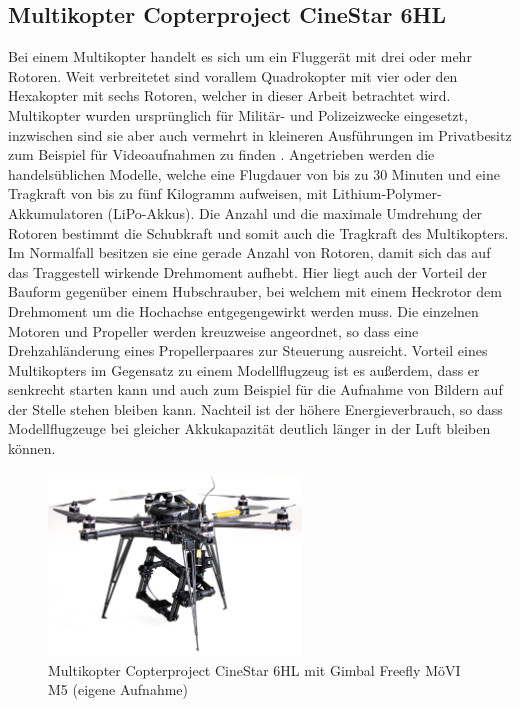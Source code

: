 \documentclass[a4paper,12pt,bibliography=totoc, listof=totoc,titlepage,pointlessnumbers]{scrreprt}
\begin{document}
\subsection{Multikopter Copterproject CineStar 6HL}
Bei einem Multikopter handelt es sich um ein Fluggerät mit drei oder mehr Rotoren. Weit verbreitetet sind vorallem Quadrokopter mit vier oder den Hexakopter mit sechs Rotoren, welcher in dieser Arbeit betrachtet wird. Multikopter wurden ursprünglich für Militär- und Polizeizwecke eingesetzt, inzwischen sind sie aber auch vermehrt in kleineren Ausführungen im Privatbesitz zum Beispiel für Videoaufnahmen zu finden \citep{Quadro}. Angetrieben werden die handelsüblichen Modelle, welche eine Flugdauer von bis zu 30 Minuten und eine Tragkraft von bis zu fünf Kilogramm aufweisen, mit Lithium-Polymer-Akkumulatoren (LiPo-Akkus). Die Anzahl und die maximale Umdrehung der Rotoren bestimmt die Schubkraft und somit auch die Tragkraft des Multikopters. Im Normalfall besitzen sie eine gerade Anzahl von Rotoren, damit sich das auf das Traggestell wirkende Drehmoment aufhebt. Hier liegt auch der Vorteil der Bauform gegenüber einem Hubschrauber, bei welchem mit einem Heckrotor dem Drehmoment um die Hochachse entgegengewirkt werden muss. Die einzelnen Motoren und Propeller werden kreuzweise angeordnet, so dass eine Drehzahländerung eines Propellerpaares zur Steuerung ausreicht. Vorteil eines Multikopters im Gegensatz zu einem Modellflugzeug ist es außerdem, dass er senkrecht starten kann und auch zum Beispiel für die Aufnahme von Bildern auf der Stelle stehen bleiben kann. Nachteil ist der höhere Energieverbrauch, so dass Modellflugzeuge bei gleicher Akkukapazität deutlich länger in der Luft bleiben können. \citep{Bachfeld}

\begin{figure}[!ht]
 \centering
 \includegraphics[width=0.6\textwidth]{./img/uav.jpg}
 \caption{Multikopter Copterproject CineStar 6HL mit Gimbal Freefly MöVI M5 (eigene Aufnahme)}
 \label{img:uav}
\end{figure}
\end{document}
